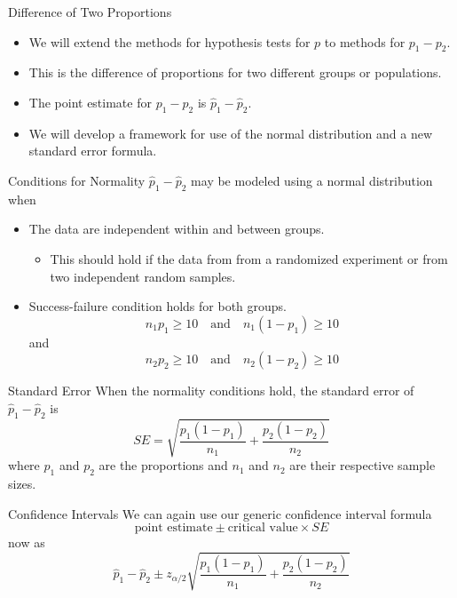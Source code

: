 \begin{frame}{Difference of Two Proportions}
    \begin{itemize}
        \item We will extend the methods for hypothesis tests for $p$ to methods for $p_1-p_2$.
        \item This is the difference of proportions for two different groups or populations.
        \item The point estimate for $p_1-p_2$ is $\hat{p}_1-\hat{p}_2$.
        \item We will develop a framework for use of the normal distribution and a new standard error formula.
    \end{itemize}
\end{frame}

\begin{frame}{Conditions for Normality}
    $\hat{p}_1-\hat{p}_2$ may be modeled using a normal distribution when
    \begin{itemize}
        \item The data are independent within and between groups. 
        \begin{itemize}
            \item This should hold if the data from from a randomized experiment or from two independent random samples.
        \end{itemize}
        \item Success-failure condition holds for both groups.
        \[
            n_1 p_1 \ge 10 \quad \text{and}\quad n_1 (1-p_1) \ge 10
        \]
        and
        \[
            n_2 p_2 \ge 10 \quad \text{and}\quad n_2 (1-p_2) \ge 10
        \]
    \end{itemize}
\end{frame}

\begin{frame}{Standard Error}
    When the normality conditions hold, the standard error of $\hat{p}_1-\hat{p}_2$ is
    \[
        SE = \sqrt{\frac{p_1(1-p_1)}{n_1} + \frac{p_2(1-p_2)}{n_2}}
    \]
    where $p_1$ and $p_2$ are the proportions and $n_1$ and $n_2$ are their respective sample sizes.
\end{frame}

\begin{frame}{Confidence Intervals}
    We can again use our generic confidence interval formula
    \[
        \text{point estimate} \pm \text{critical value} \times SE
    \]
    now as
    \[
        \hat{p}_1-\hat{p}_2 \pm z_{\alpha/2}\sqrt{\frac{p_1(1-p_1)}{n_1} + \frac{p_2(1-p_2)}{n_2}}
    \]
\end{frame}

